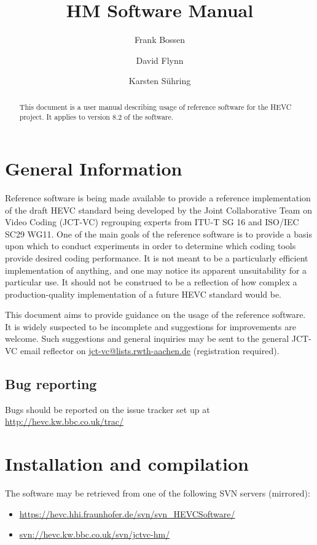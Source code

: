 \documentclass[a4paper,11pt]{jctvcdoc}
\title{HM Software Manual}
\author{%
	Frank Bossen
	\email{bossen@docomoinnovations.com}
	\and
	David Flynn
	\email{davidf@rd.bbc.co.uk}
	\and
	Karsten S\"uhring
	\email{Karsten.Suehring@hhi.fraunhofer.de}
}
\begin{document}
\maketitle
\begin{abstract}
This document is a user manual describing usage of reference software
for the HEVC project. It applies to version 8.2
of the software.
\end{abstract}

\tableofcontents
\listoftables

\section{General Information}
Reference software is being made available to provide a reference
implementation of the draft HEVC standard being developed by the Joint
Collaborative Team on Video Coding (JCT-VC) regrouping experts from
ITU-T SG 16 and ISO/IEC SC29 WG11. One of the main goals of the
reference software is to provide a basis upon which to conduct
experiments in order to determine which coding tools provide desired
coding performance. It is not meant to be a particularly efficient
implementation of anything, and one may notice its apparent
unsuitability for a particular use. It should not be construed to be a
reflection of how complex a production-quality implementation of a
future HEVC standard would be.

This document aims to provide guidance on the usage of the reference
software. It is widely suspected to be incomplete and suggestions for
improvements are welcome. Such suggestions and general inquiries may be
sent to the general JCT-VC email reflector on
\url{jct-vc@lists.rwth-aachen.de} (registration required).

\subsection*{Bug reporting}
Bugs should be reported on the issue tracker set up at
\url{http://hevc.kw.bbc.co.uk/trac/}

\section{Installation and compilation}
The software may be retrieved from one of the following SVN servers
(mirrored):
\begin{itemize}
\item \url{https://hevc.hhi.fraunhofer.de/svn/svn_HEVCSoftware/}
\item \url{svn://hevc.kw.bbc.co.uk/svn/jctvc-hm/}
\end{itemize}
\end{document}
